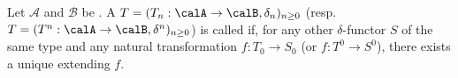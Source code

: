 \begin{definition} \label{definition:universal_homological_cohomological_delta_functor_between_abelian_cateogries}
    Let $\mathcal{A}$ and $\mathcal{B}$ be . 
A  $T = (T_n: \calA \to \calB, \delta_n)_{n \geq 0}$ (resp. $T = (T^n: \calA \to \calB, \delta^n)_{n \geq 0}$) is called  if, for any other $\delta$-functor $S$ of the same type and any natural transformation $f: T_0 \to S_0$ (or $f: T^0 \to S^0$), there exists a unique  extending $f$.
\end{definition}
